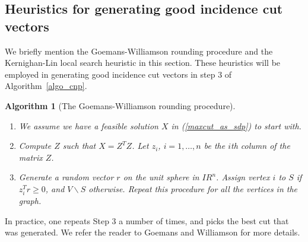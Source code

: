 \documentclass[12pt]{article}
\newcommand{\real}{I\!\!R}
\newtheorem{algorithm1}{Algorithm}
\newenvironment{algorithm}[1]{\begin{algorithm1}[#1]~\\
    \vspace{-0.5cm}}{\end{algorithm1}}
\begin{document}
\subsection{Heuristics for generating good incidence cut vectors}
\label{heuristics} We briefly mention the Goemans-Williamson
rounding procedure and the Kernighan-Lin local search heuristic in
this section. These heuristics will be employed in generating good
incidence cut vectors in step 3 of Algorithm~\ref{algo_cnp}.

\begin{algorithm}
{The Goemans-Williamson rounding procedure}
\begin{enumerate}
\item We assume we have a feasible solution $X$ in
(\ref{maxcut_as_sdp}) to start with. \item Compute $Z$ such that
$X = Z^TZ$. Let $z_i$, $i=1,\ldots,n$ be the $i$th column of the
matrix $Z$. \item Generate a random vector $r$ on the unit sphere
in $\real^n$. Assign vertex $i$ to $S$ if $z_i^Tr \ge 0$, and $V
\backslash S$ otherwise. Repeat this procedure for all the
vertices in the graph.
\end{enumerate}
\end{algorithm}
In practice, one repeats Step 3 a number of times, and picks the
best cut that was generated. We refer the reader to Goemans and
Williamson \cite{goemans1} for more details.
\end{document}
